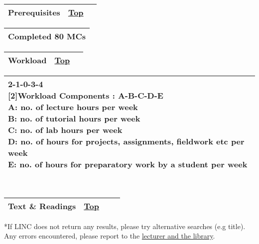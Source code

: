 { }

\begin{longtable}[]{@{}ll@{}}
\toprule
{\protect\hypertarget{Prerequisites}{}{}Prerequisites} &
{\protect\hyperlink{top}{Top}~~}\tabularnewline
\bottomrule
\end{longtable}

\begin{longtable}[]{@{}l@{}}
\toprule
\protect\hypertarget{ctl00_ctl00_ContentPlaceHolder1_ContentPlaceHolder1_LV_CourseInfo_ctrl0_lblCourseInfo}{}{Completed
80 MCs}\tabularnewline
\bottomrule
\end{longtable}

\begin{longtable}[]{@{}ll@{}}
\toprule
{\protect\hypertarget{Workload}{}{}Workload} &
{\protect\hyperlink{top}{Top}~~}\tabularnewline
\bottomrule
\end{longtable}

\begin{longtable}[]{@{}l@{}}
\toprule
\protect\hypertarget{ctl00_ctl00_ContentPlaceHolder1_ContentPlaceHolder1_LV_CourseInfo_ctrl1_lblCourseInfo}{}{2-1-0-3-4\\[2\baselineskip]Workload
Components : A-B-C-D-E\\
A: no. of lecture hours per week\\
B: no. of tutorial hours per week\\
C: no. of lab hours per week\\
D: no. of hours for projects, assignments, fieldwork etc per week\\
E: no. of hours for preparatory work by a student per
week}\tabularnewline
\bottomrule
\end{longtable}

~

\hypertarget{ctl00_ctl00_ContentPlaceHolder1_ContentPlaceHolder1_pnlReferences}{}
\begin{longtable}[]{@{}lll@{}}
\toprule
{\protect\hypertarget{References}{}{}Text \& Readings} &
{\protect\hyperlink{top}{Top}} & {~~}\tabularnewline
\bottomrule
\end{longtable}

\protect\hypertarget{ctl00_ctl00_ContentPlaceHolder1_ContentPlaceHolder1_lblDisclaimer}{}{*If
LINC does not return any results, please try alternative searches (e.g
title). Any errors encountered, please report to the
\href{mailto:clbfrm05@nus.edu.sg?cc=e0210471@u.nus.edu\&subject=IVLE:\%20ISBN\%20Error\&body=Errors\%20encountered\%0A\%0AFrom\%20Module\%20\%5BIS4204\%5D\%20Outline\%20\%3E\%3E\%20under\%20Text\%20and\%20Readings\%20Section\%0A\%0AThis\%20is\%20a\%20system\%20generated\%20email,\%20please\%20do\%20not\%20reply.\%0A\%0ARegards,\%0AIVLE\%20Team}{lecturer
and the library}.}

